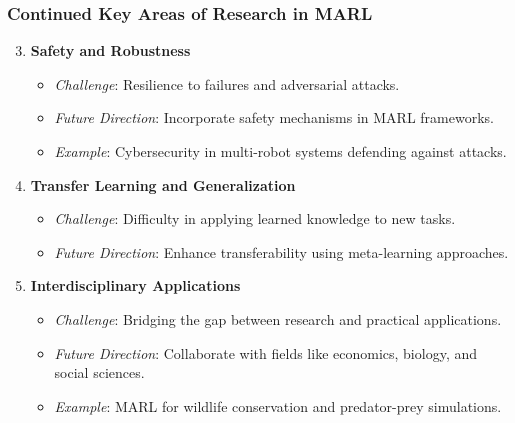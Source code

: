 \documentclass[aspectratio=169]{beamer}
\begin{document}
\begin{frame}[fragile]
    \frametitle{Continued Key Areas of Research in MARL}
    \begin{enumerate}
        \setcounter{enumi}{2} %
        \item \textbf{Safety and Robustness}
            \begin{itemize}
                \item \textit{Challenge}: Resilience to failures and adversarial attacks.
                \item \textit{Future Direction}: Incorporate safety mechanisms in MARL frameworks.
                \item \textit{Example}: Cybersecurity in multi-robot systems defending against attacks.
            \end{itemize}

        \item \textbf{Transfer Learning and Generalization}
            \begin{itemize}
                \item \textit{Challenge}: Difficulty in applying learned knowledge to new tasks.
                \item \textit{Future Direction}: Enhance transferability using meta-learning approaches.
            \end{itemize}
        
        \item \textbf{Interdisciplinary Applications}
            \begin{itemize}
                \item \textit{Challenge}: Bridging the gap between research and practical applications.
                \item \textit{Future Direction}: Collaborate with fields like economics, biology, and social sciences.
                \item \textit{Example}: MARL for wildlife conservation and predator-prey simulations.
            \end{itemize}
    \end{enumerate}
\end{frame}
\end{document}
